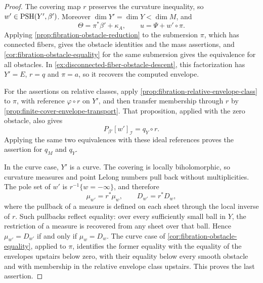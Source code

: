 \begin{proof}
The covering map $r$ preserves the curvature inequality, so $w'\in\mathrm{PSH}(Y',\beta')$. Moreover $\dim Y'=\dim Y<\dim M$, and
\[
 \Theta=\pi^*\beta'+\kappa_A,\qquad u=\Psi+w'\circ\pi.
\]
Applying \cref{prop:fibration-obstacle-reduction} to the submersion $\pi$, which has connected fibers, gives the obstacle identities and the mass assertions, and \cref{cor:fibration-obstacle-equality} for the same submersion gives the equivalence for all obstacles. In \cref{ex:disconnected-fiber-obstacle-descent}, this factorization has $Y'=E$, $r=q$ and $\pi=a$, so it recovers the computed envelope.

For the assertions on relative classes, apply \cref{prop:fibration-relative-envelope-class} to $\pi$, with reference $\varphi\circ r$ on $Y'$, and then transfer membership through $r$ by \cref{prop:finite-cover-envelope-transport}. That proposition, applied with the zero obstacle, also gives
\[
 P_{\beta'}[w']_{\mathcal I}=q_Y\circ r.
\]
Applying the same two equivalences with these ideal references proves the assertion for $q_M$ and $q_Y$.

In the curve case, $Y'$ is a curve. The covering is locally biholomorphic, so curvature measures and point Lelong numbers pull back without multiplicities. The pole set of $w'$ is $r^{-1}\{w=-\infty\}$, and therefore
\[
 \mu_{w'}=r^*\mu_w,\qquad D_{w'}=r^*D_w,
\]
where the pullback of a measure is defined on each sheet through the local inverse of $r$. Such pullbacks reflect equality: over every sufficiently small ball in $Y$, the restriction of a measure is recovered from any sheet over that ball. Hence $\mu_{w'}=D_{w'}$ if and only if $\mu_w=D_w$. The curve case of \cref{cor:fibration-obstacle-equality}, applied to $\pi$, identifies the former equality with the equality of the envelopes upstairs below zero, with their equality below every smooth obstacle and with membership in the relative envelope class upstairs. This proves the last assertion.
\end{proof}
